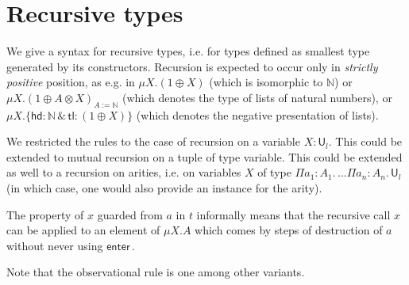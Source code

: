 \documentclass{article}
\newcommand{\mkprod}[3]{\Pi {#1}\!:\!{#2}.\,{#3}}
\newcommand{\nat}{\mathbb{N}}
\newcommand{\headname}{\mathsf{hd}}
\newcommand{\tailname}{\mathsf{tl}}
\newcommand{\sort}[1]{\mathsf{U}_{#1}}
\begin{document}
\section{Recursive types}

\newcommand{\inmu}[1]{\mathsf{enter}\,#1}
\newcommand{\appmu}[4]{\mathsf{fix\,}{#1}\,[\mathsf{enter}\,{#3}\,\mapsto\,{#2}]\,\mathsf{in}\,{#1}\,{#4}}

We give a syntax for recursive types, i.e. for types defined as
smallest type generated by its constructors. Recursion is expected to
occur only in {\em strictly positive} position, as e.g. in $\mu X.(1
\oplus X)$ (which is isomorphic to $\nat$) or $\mu X.(1 \oplus A
\otimes X)_{A:=\nat}$ (which denotes the type of lists of natural
numbers), or $\mu X.\{\headname : \nat \,\&\, \tailname : (1 \oplus X)\}$ (which
denotes the negative presentation of lists).

We restricted the rules to the case of recursion on a variable
$X:\sort{l}$. This could be extended to mutual recursion on a tuple of
type variable. This could be extended as well to a recursion on
arities, i.e. on variables $X$ of type
$\mkprod{a_1}{A_1}{...\mkprod{a_n}{A_n}{\sort{l}}}$ (in which case,
one would also provide an instance for the arity).

The property of $x$ guarded from $a$ in $t$ informally means that the
recursive call $x$ can be applied to an element of $\mu X. A$ which
comes by steps of destruction of $a$ without never using $\inmu{}$.

Note that the observational rule is one among other variants.
\end{document}
